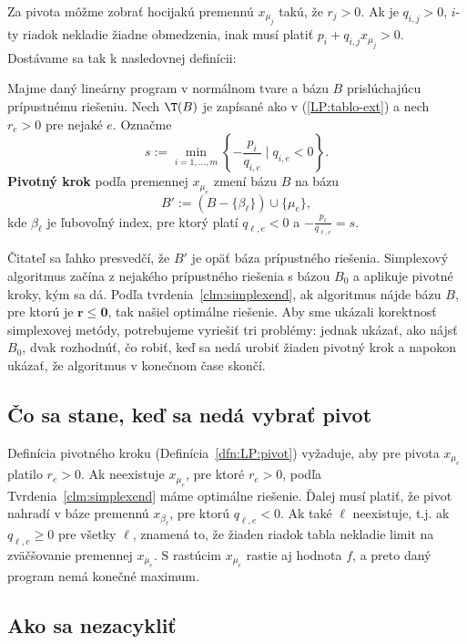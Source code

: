 \noindent
Za pivota môžme zobrať hocijakú premennú $x_{\mu_j}$ takú, že $r_j>0$. Ak je $q_{i,j}>0$, $i$-ty 
riadok nekladie žiadne obmedzenia, inak musí platiť
$p_i+q_{i,j}x_{\mu_j}>0$.
Dostávame sa tak k nasledovnej definícii:


\begin{framed}
  \begin{dfn}
    \label{dfn:LP:pivot}
    Majme daný lineárny program v normálnom tvare a bázu $B$ prislúchajúcu prípustnému riešeniu. Nech $\T(B)$
    je zapísané ako v (\ref{LP:tablo-ext}) a nech $r_e>0$ pre nejaké $e$.
    Označme $$s:=\min_{i=1,\ldots,m}\left\{-\frac{p_i}{q_{i,e}}\mid q_{i,e}<0\right\}.$$
    {\bfseries Pivotný krok} podľa premennej $x_{\mu_e}$ zmení bázu $B$ na bázu 
    $$B':=\left(B-\{\beta_\ell\}\right)\cup\{\mu_e\},$$
    kde $\beta_\ell$ je ľubovoľný index, pre ktorý  platí
    $q_{\ell,e}<0$ a 
      $-\frac{p_\ell}{q_{\ell,e}} =s$.
  \end{dfn}
\end{framed}


\noindent
Čitateľ sa ľahko presvedčí, že $B'$ je opäť báza prípustného riešenia.
Simplexový algoritmus začína z nejakého prípustného riešenia s bázou $B_0$ a aplikuje pivotné kroky, kým sa dá.
Podľa tvrdenia~\ref{clm:simplexend}, ak algoritmus nájde bázu $B$, pre ktorú je $\bm{r}\le\bm{0}$,
tak našiel optimálne riešenie.
Aby sme ukázali korektnosť simplexovej metódy, potrebujeme vyriešiť tri problémy: jednak ukázať, ako nájsť $B_0$, 
dvak rozhodnúť, čo robiť, keď
sa nedá urobiť žiaden pivotný krok a napokon ukázať, že algoritmus v konečnom čase skončí.

\subsection*{Čo sa stane, keď sa nedá vybrať pivot}

\noindent
Definícia pivotného kroku (Definícia~\ref{dfn:LP:pivot}) vyžaduje, aby pre pivota $x_{\mu_e}$ platilo $r_e>0$.
Ak neexistuje $x_{\mu_e}$, pre ktoré $r_e>0$,
podľa Tvrdenia~\ref{clm:simplexend} máme optimálne riešenie.
Ďalej musí platiť, že
pivot nahradí v báze premennú $x_{\beta_\ell}$, pre ktorú $q_{\ell,e}<0$.
Ak také $\ell$ neexistuje, t.j. ak $q_{\ell,e}\ge0$ pre všetky $\ell$, znamená to,
že žiaden riadok tabla nekladie limit na zväčšovanie premennej $x_{\mu_e}$. S rastúcim $x_{\mu_e}$
rastie aj hodnota $f$, a preto daný program nemá konečné maximum.

\subsection*{Ako sa nezacykliť}

